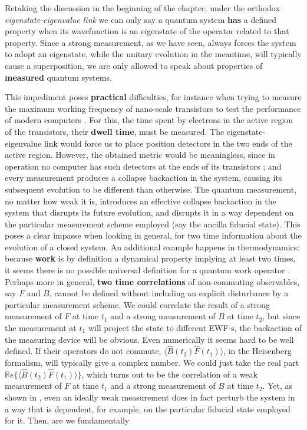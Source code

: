 \documentclass[11pt, a4paper]{article} %
\begin{document}
Retaking the discussion in the beginning of the chapter, under the orthodox {\em eigenstate-eigenvalue link} we can only say a quantum system {\bf has} a defined property when its wavefunction is an eigenstate of the operator related to that property. Since a strong measurement, as we have seen, always forces the system to adopt an eigenstate, while the unitary evolution in the meantime, will typically cause a superposition, we are only allowed to speak about properties of {\bf measured} quantum systems. %

This impediment poses {\bf practical} difficulties, for instance when trying to measure the maximum working frequency of nano-scale transistors to test the performance of modern computers \cite{modern}. For this, the time spent by electrons in the active region of the transistors, their {\bf dwell time}, must be measured. The eigenstate-eigenvalue link would force us to place position detectors in the two ends of the active region. However, the obtained metric would be meaningless, since in operation no computer has such detectors at the ends of its transistors \cite{tunnel1, tunnel2}; and every measurement produces a collapse backaction in the system, causing its subsequent evolution to be different than otherwise. The quantum measurement, no matter how weak it is, introduces an effective collapse backaction in the system that disrupts its future evolution, and disrupts it in a way dependent on the particular measurement scheme employed (say the ancilla fiducial state). This poses a clear impasse when looking in general, for two time information about the evolution of a closed system. An additional example happens in thermodynamics: because {\bf work} is by definition a dynamical property implying at least two times, it seems there is no possible universal definition for a quantum work operator \cite{nogo, workPb1, workPb2}. Perhaps more in general, {\bf two time correlations} of non-commuting observables, say $F$ and $B$, cannot be defined without including an explicit disturbance by a particular measurement scheme. We could correlate the result of a strong measurement of $F$ at time $t_1$ and a strong measurement of $B$ at time $t_2$, but since the measurement at $t_1$ will project the state to different EWF-s, the backaction of the measuring device will be obvious. Even numerically it seems hard to be well defined. If their operators do not commute, $\langle \hat{B}(t_2)\hat{F}(t_1)\rangle$, in the Heisenberg formalism, will typically give a complex number. We could just take the real part $\mathbb{R}e \big\{\langle \hat{B}(t_2)\hat{F}(t_1)\rangle\big\}$, which turns out to be the correlation of a weak measurement \cite{Weak} of $F$ at time $t_1$ and a strong measurement of $B$ at time $t_2$. Yet, as shown in \cite{spin}, even an ideally weak measurement does in fact perturb the system in a way that is dependent, for example, on the particular fiducial state employed for it. Then, are we fundamentally 
\end{document}

